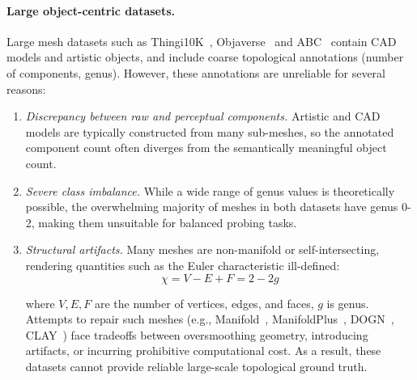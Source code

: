 

\paragraph{Large object-centric datasets.}
Large mesh datasets such as Thingi10K~\cite{thingi}, Objaverse~\cite{objaverse} and ABC~\cite{abc} contain CAD models and artistic objects, and include coarse topological annotations (number of components, genus). However, these annotations are unreliable for several reasons:

\begin{enumerate}
  \item \textit{Discrepancy between raw and perceptual components.} Artistic and CAD models are typically constructed from many sub-meshes, so the annotated component count often diverges from the semantically meaningful object count.
  \item \textit{Severe class imbalance.} While a wide range of genus values is theoretically possible, the overwhelming majority of meshes in both datasets have genus 0-2, making them unsuitable for balanced probing tasks.
  \item \textit{Structural artifacts.} Many meshes are non-manifold or self-intersecting, rendering quantities such as the Euler characteristic ill-defined:
\begin{equation}
  \chi = V - E + F = 2 - 2g
  \label{eq:euler}
\end{equation}

where $V,E,F$ are the number of vertices, edges, and faces, $g$ is genus.
Attempts to repair such meshes (e.g., Manifold~\cite{manifold}, ManifoldPlus~\cite{manifoldplus}, DOGN~\cite{dogn}, CLAY~\cite{clay}) face tradeoffs between oversmoothing geometry, introducing artifacts, or incurring prohibitive computational cost. As a result, these datasets cannot provide reliable large-scale topological ground truth.
\end{enumerate}

